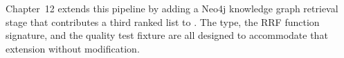 Chapter~12 extends this pipeline by adding a Neo4j knowledge graph retrieval
stage that contributes a third ranked list to .
The  type, the RRF function signature, and the
quality test fixture are all designed to accommodate that extension without
modification.
